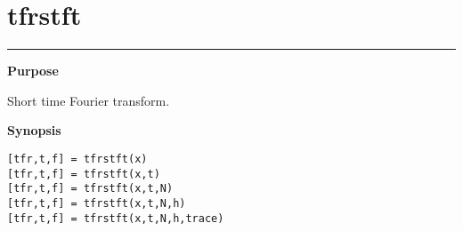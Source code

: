 

\section*{\hspace*{-1.6cm} tfrstft}

\vspace*{-.4cm}
\hspace*{-1.6cm}\rule[0in]{16.5cm}{.02cm}
\vspace*{.2cm}

{\bf \large \sf Purpose}\\
\hspace*{1.5cm}
\begin{minipage}[t]{13.5cm}
Short time Fourier transform.
\end{minipage}
\vspace*{.5cm}

{\bf \large \sf Synopsis}\\
\hspace*{1.5cm}
\begin{minipage}[t]{13.5cm}
\begin{verbatim}
[tfr,t,f] = tfrstft(x)
[tfr,t,f] = tfrstft(x,t)
[tfr,t,f] = tfrstft(x,t,N)
[tfr,t,f] = tfrstft(x,t,N,h)
[tfr,t,f] = tfrstft(x,t,N,h,trace)
\end{verbatim}
\end{minipage}
\vspace*{.5cm}

